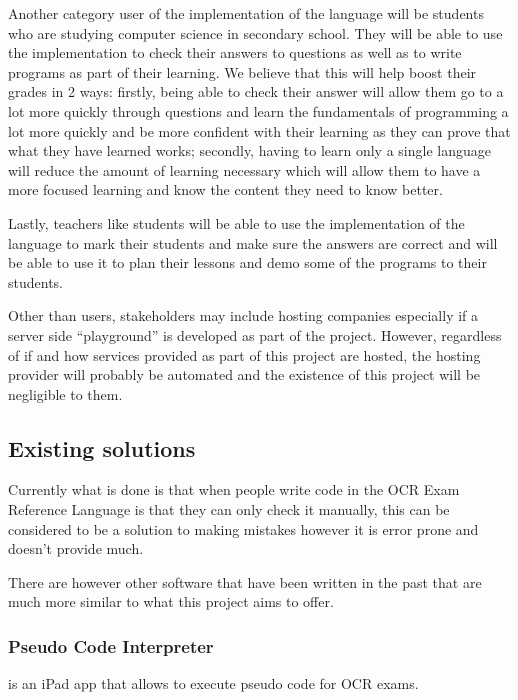 \documentclass{article}
\begin{document}
Another category user of the implementation of the language will be students
who are studying computer science in secondary school. They will be able to use
the implementation to check their answers to questions as well as to write
programs as part of their learning. We believe that this will help boost their
grades in 2 ways: firstly, being able to check their answer will allow them go
to a lot more quickly through questions and learn the fundamentals of
programming a lot more quickly and be more confident with their learning as
they can prove that what they have learned works; secondly, having to learn
only a single language will reduce the amount of learning necessary which will
allow them to have a more focused learning and know the content they need to
know better.

Lastly, teachers like students will be able to use the implementation of the
language to mark their students and make sure the answers are correct and will
be able to use it to plan their lessons and demo some of the programs to their
students.

Other than users, stakeholders may include hosting companies especially if a
server side ``playground'' is developed as part of the project. However,
regardless of if and how services provided as part of this project are hosted,
the hosting provider will probably be automated and the existence of this
project will be negligible to them.


\subsection{Existing solutions}

Currently what is done is that when people write code in the OCR Exam Reference
Language is that they can only check it manually, this can be considered to be
a solution to making mistakes however it is error prone and doesn't provide
much.

There are however other software that have been written in the past that are
much more similar to what this project aims to offer.

\subsubsection{Pseudo Code Interpreter}

\Textcite{jacobsieradzki18} is an iPad app that allows to execute pseudo code
for OCR exams.
\end{document}
